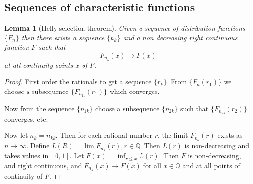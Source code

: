 \documentclass[10pt, oneside, reqno]{amsart}
\theoremstyle{plain}%
\newtheorem{lem}[thm]{Lemma}
\theoremstyle{definition}
\theoremstyle{remark}
\newcommand{\Q}{\mathbb{Q}}
\begin{document}
\subsection{Sequences of characteristic functions} %
\label{sub:sequences_of_characteristic_functions}

\begin{lem}[Helly selection theorem]\label{lem:hellysel}
	Given a sequence of distribution functions $\{ F_n \}$ then there exists a sequence $\{ n_k \}$ and a non decreasing right continuous function $F$ such that \[
		F_{n_k}(x) \rightarrow F(x)
	\] at all continuity points $x$ of $F$.  
\end{lem}
\begin{proof}
	First order the rationals to get a sequence $\{ r_k \}$.  From $\{ F_n(r_1)\}$ we choose a subsequence $\{ F_{n_{1k}}(r_1) \}$ which converges.  
	
	Now from the sequence $\{ n_{1k} \}$ choose a subsequence $\{ n_{2k} \}$ such that $\{ F_{n_{2k}}(r_2) \}$ converges, etc.
	
	Now let $n_k = n_{kk}$.  Then for each rational number $r$, the limit $F_{n_k}(r)$ exists as $n \rightarrow \infty$.  Define $L(R) = \lim F_{n_k}(r), r \in \Q$.  Then $L(r)$ is non-decreasing and takes values in $[0,1]$.  Let $F(x) = \inf_{r \leq x} L(r)$.  Then $F$ is non-decreasing, and right continuous, and $F_{n_k}(x) \rightarrow F(x)$ for all $x \in \Q$ and at all points of continuity of $F$.  
\end{proof}
\end{document}
